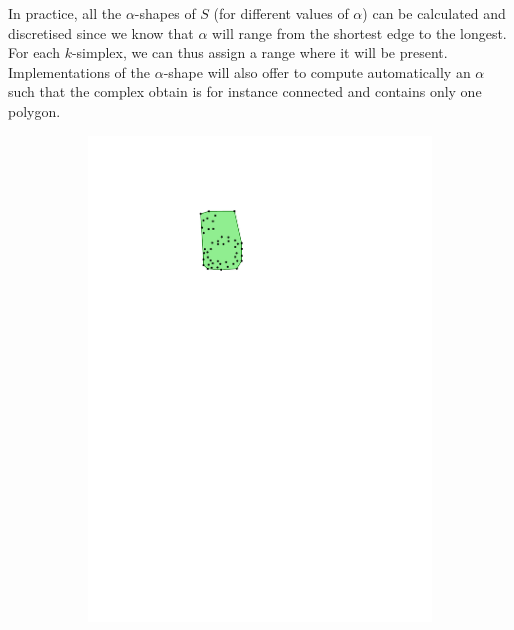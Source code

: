 In practice, all the $\alpha$-shapes of $S$ (for different values of $\alpha$) can be calculated and discretised since we know that $\alpha$ will range from the shortest edge to the longest.
For each $k$-simplex, we can thus assign a range where it will be present.
Implementations of the $\alpha$-shape will also offer to compute automatically an $\alpha$ such that the complex obtain is for instance connected and contains only one polygon.
\begin{figure}
  \centering
  \begin{subfigure}[b]{0.15\linewidth}
    \centering
    \includegraphics[page=1,width=\textwidth]{figs/alphashape.pdf}
    \caption{}
    \label{fig:aplhashape:a}
  \end{subfigure}
  \qquad 
  \begin{subfigure}[b]{0.15\linewidth}
    \centering

\end{subfigure}
\end{figure}
